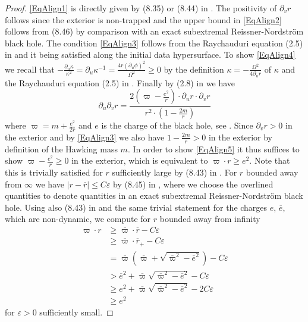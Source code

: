 \documentclass[reqno]{article}
\newcommand{\rd}{\partial}
\begin{document}
\begin{proof}
\eqref{EqAlign1} is directly given by (8.35) or (8.44) in \cite{LukOh19II}. The positivity of $\rd_v r$ follows since the exterior is non-trapped and the upper bound in \eqref{EqAlign2} follows from (8.46) by comparison with an exact subextremal Reissner-Nordstr\"om black hole. The condition \eqref{EqAlign3} follows from the Raychauduri equation (2.5) in \cite{LukOh19II} and it being satisfied along the initial data hypersurface. To show \eqref{EqAlign4} we recall that $-\frac{\rd_u \kappa}{\kappa^2} = \rd_u \kappa^{-1} = \frac{4 r (\rd_u \phi)^2}{\Omega^2} \geq 0$ by the definition $\kappa = - \frac{\Omega^2}{4 \rd_u r}$ of $\kappa$ and the Raychauduri equation (2.5) in \cite{LukOh19II}. Finally by (2.8) in \cite{LukOh19II} we have $$\rd_u \rd_v r  = \frac{2 (\varpi - \frac{e^2}{r}) \cdot \rd_u r \cdot \rd_v r}{r^2 \cdot (1 - \frac{2m}{r})} $$ where $\varpi = m + \frac{e^2}{2r}$ and $e$ is the charge of the black hole, see \cite{LukOh19II}. Since $\rd_v r >0$ in the exterior and by \eqref{EqAlign3} we also have $1 - \frac{2m}{r} >0$ in the exterior by definition of the Hawking mass $m$. In order to show \eqref{EqAlign5} it thus suffices to show $\varpi - \frac{e^2}{r} \geq0$ in the exterior, which is equivalent to $\varpi \cdot r \geq e^2$. Note that this is trivially satisfied for $r$ sufficiently large by (8.43) in \cite{LukOh19II}. For $r$ bounded away from $\infty$ we have $|r - \overline{r}| \leq C \varepsilon$ by (8.45) in \cite{LukOh19II}, where we choose  the overlined quantities to denote quantities in an exact subextremal Reissner-Nordstr\"om black hole. Using also (8.43) in \cite{LukOh19II} and the same trivial statement for the charges $e$, $\overline{e}$, which are non-dynamic, we compute for $r $ bounded away from infinity
\begin{equation*}
\begin{split}
\varpi \cdot r & \geq \overline{\varpi} \cdot \overline{r} - C \varepsilon\\
&\geq \overline{\varpi} \cdot \overline{r}_+ - C \varepsilon \\
&= \overline{\varpi}(\overline{\varpi} + \sqrt{ \overline{\varpi}^2 - \overline{e}^2}) - C \varepsilon \\
&> \overline{e}^2 + \overline{\varpi} \sqrt{ \overline{\varpi}^2 - \overline{e}^2} - C \varepsilon \\
&\geq e^2 + \overline{\varpi} \sqrt{ \overline{\varpi}^2 - \overline{e}^2} - 2C \varepsilon \\
&\geq e^2 
\end{split}
\end{equation*}
for $\varepsilon>0$ sufficiently small.


\end{proof}
\end{document}
